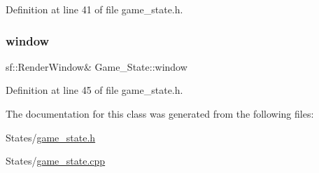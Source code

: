 Definition at line 41 of file game\+\_\+state.\+h.

\hypertarget{class_game___state_a5a9bb4b732ee25b0f9de3baa2ee71045}{}\label{class_game___state_a5a9bb4b732ee25b0f9de3baa2ee71045} 
\subsubsection{\texorpdfstring{window}{window}}
{\footnotesize\ttfamily sf\+::\+Render\+Window\& Game\+\_\+\+State\+::window\hspace{0.3cm}{\ttfamily [protected]}}



Definition at line 45 of file game\+\_\+state.\+h.



The documentation for this class was generated from the following files\+:\begin{DoxyCompactItemize}
\item 
States/\hyperlink{game__state_8h}{game\+\_\+state.\+h}\item 
States/\hyperlink{game__state_8cpp}{game\+\_\+state.\+cpp}\end{DoxyCompactItemize}
